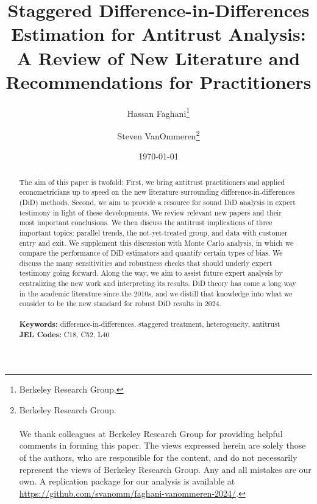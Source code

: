 \documentclass[12pt]{article}
\begin{document}
\begin{titlepage}
\title{Staggered Difference-in-Differences Estimation for Antitrust Analysis: A Review of New Literature and Recommendations for Practitioners}
\author{Hassan Faghani\thanks{Berkeley Research Group.} \and Steven VanOmmeren\thanks{
Berkeley Research Group. \\\\ We thank colleagues at Berkeley Research Group for providing helpful comments in forming this paper. The views expressed herein are solely those of the authors, who are responsible for the content, and do not necessarily represent the views of Berkeley Research Group. Any and all mistakes are our own. A replication package for our analysis is available at \url{https://github.com/svanomm/faghani-vanommeren-2024/}.
}
}

\date{\today}
\maketitle
\begin{abstract}
\noindent 
The aim of this paper is twofold: First, we bring antitrust practitioners and applied econometricians up to speed on the new literature surrounding difference-in-differences (DiD) methods. Second, we aim to provide a resource for sound DiD analysis in expert testimony in light of these developments. We review relevant new papers and their most important conclusions. We then discuss the antitrust implications of three important topics: parallel trends, the not-yet-treated group, and data with customer entry and exit. We supplement this discussion with Monte Carlo analysis, in which we compare the performance of DiD estimators and quantify certain types of bias. We discuss the many sensitivities and robustness checks that should underly expert testimony going forward. Along the way, we aim to assist future expert analysis by centralizing the new work and interpreting its results. DiD theory has come a long way in the academic literature since the 2010s, and we distill that knowledge into what we consider to be the new standard for robust DiD results in 2024.\\
\vspace{0in}\\
\noindent\textbf{Keywords:} difference-in-differences, staggered treatment, heterogeneity, antitrust
\vspace{0in}\\
\noindent\textbf{JEL Codes:} C18, C52, L40\\

\bigskip
\end{abstract}
\setcounter{page}{0}
\thispagestyle{empty}
\end{titlepage}
\pagebreak \newpage
\end{document}

